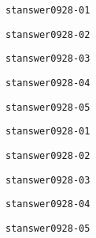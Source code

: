 \documentclass[11pt,dvipdfmx]{ujarticle}
\begin{document}
\newpage
\begin{center}
\verb|stanswer0928-01|\\
\end{center}
\newpage
\begin{center}
\verb|stanswer0928-02|\\
\end{center}
\newpage
\begin{center}
\verb|stanswer0928-03|\\
\end{center}
\newpage
\begin{center}
\verb|stanswer0928-04|\\
\end{center}
\newpage
\begin{center}
\verb|stanswer0928-05|\\
\end{center}
\newpage
\begin{center}
\verb|stanswer0928-01|\\
\end{center}
\newpage
\begin{center}
\verb|stanswer0928-02|\\
\end{center}
\newpage
\begin{center}
\verb|stanswer0928-03|\\
\end{center}
\newpage
\begin{center}
\verb|stanswer0928-04|\\
\end{center}
\newpage
\begin{center}
\verb|stanswer0928-05|\\
\end{center}
\newpage
\end{document}

